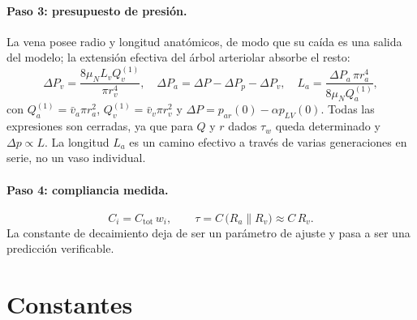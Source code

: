 \documentclass[11pt]{article}
\begin{document}
\paragraph{Paso 3: presupuesto de presi\'on.} La vena posee radio y longitud
anat\'omicos, de modo que su ca\'ida es una salida del modelo; la extensi\'on
efectiva del \'arbol arteriolar absorbe el resto:
\begin{equation}
  \Delta P_v=\frac{8\mu_N L_v Q_v^{(1)}}{\pi r_v^{4}},
  \quad
  \Delta P_a=\Delta P-\Delta P_{p}-\Delta P_v,
  \quad
  L_a=\frac{\Delta P_a\,\pi r_a^{4}}{8\mu_N Q_a^{(1)}},
  \label{eq:paso3}
\end{equation}
con $Q_a^{(1)}=\bar v_a\pi r_a^2$, $Q_v^{(1)}=\bar v_v\pi r_v^2$ y
$\Delta P=p_{ar}(0)-\alpha p_{LV}(0)$. Todas las expresiones son cerradas, ya
que para $Q$ y $r$ dados $\tau_w$ queda determinado y $\Delta p\propto L$. La
longitud $L_a$ es un camino efectivo a trav\'es de varias generaciones en serie,
no un vaso individual.

\paragraph{Paso 4: compliancia medida.}
\begin{equation}
  C_i=C_{\text{tot}}\,w_i ,
  \qquad
  \tau=C\,\bigl(R_a\parallel R_v\bigr)\approx C\,R_v .
  \label{eq:paso4}
\end{equation}
La constante de decaimiento deja de ser un par\'ametro de ajuste y pasa a ser
una predicci\'on verificable.

\section{Constantes}
\end{document}
